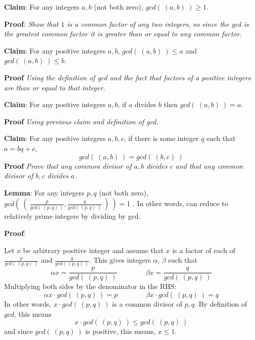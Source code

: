 \documentclass[12pt, oneside]{article}
\begin{document}
\vspace{50pt} 

{\bf Claim}: For any integers $a,b$ (not both zero), $gcd(~(a,b)~) \geq 1$.

{\bf Proof}: {\it Show that $1$ is a common factor of any two integers, so since the gcd 
is the greatest common factor it is greater than or equal to any common factor.}

\vspace{150pt}

{\bf Claim}: For any positive integers $a,b$, $gcd(~(a,b)~) \leq a$ and $gcd( ~(a,b)~) \leq b$.

{\bf Proof} {\it Using the definition of gcd and the fact that factors of a positive integers
are than or equal to that integer.}

\vspace{150pt}

{\bf Claim}: For any positive integers $a,b$, if $a$ divides $b$ then $gcd(~(a,b)~) = a$.

{\bf Proof} {\it Using previous claim and definition of gcd.}

\vspace{150pt}


{\bf Claim}: For any positive integers $a,b,c$, if there is some integer $q$ such that $a = bq + c$,
\[
    gcd(~(a,b)~) = gcd (~(b,c)~)
\]
{\bf Proof} {\it Prove that any common divisor of $a,b$ divides $c$ and that any common 
divisor of $b,c$ divides $a$.}

\vspace{150pt}
 

{\bf Lemma}: For any integers $p, q$ (not both zero), 
$gcd \left(~ \left(~\frac{p}{gcd(~(p,q)~)}, \frac{q}{gcd(~(p,q)~)} ~\right) ~\right) = 1$ .
In other words, can reduce to relatively prime integers by dividing by gcd.

{\bf Proof}:

Let $x$ be arbitrary positive integer and assume that $x$ is a 
factor of each of $\frac{p}{gcd(~(p,q)~)}$ and $\frac{q}{gcd(~(p,q)~)}$. 
This gives integers $\alpha$, $\beta$ such that 
\[
    \alpha x = \frac{p}{gcd(~(p,q)~)} \qquad \qquad \beta x = \frac{q}{gcd(~(p,q)~)}
\]
Multiplying both sides by the denominator in the RHS: 
\[
    \alpha x \cdot gcd(~(p,q)~)= p \qquad \qquad \beta x \cdot gcd(~(p,q)~)= q
\]
In other words, $x \cdot gcd(~(p,q)~)$ is a common divisor of $p, q$. By definition of $gcd$, this means
\[
    x \cdot gcd (~(p,q)~) \leq gcd (~(p,q)~)
\]
and since $gcd(~(p,q)~)$ is positive, this means, $x \leq 1$.
\vspace{350pt}
 
\end{document}
